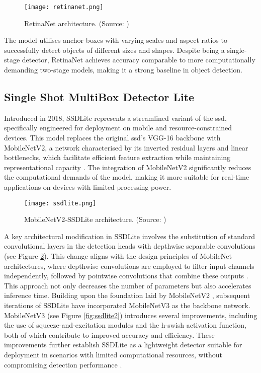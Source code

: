 \begin{figure}[!htbp]
    \centering
    \texttt{[image: retinanet.png]}
    \caption{RetinaNet architecture. (Source: \cite{retinanet})}
    \label{fig:retinanet}
\end{figure}

The model utilises anchor boxes with varying scales and aspect ratios to successfully detect objects of different sizes and shapes. Despite being a single-stage detector, RetinaNet achieves accuracy comparable to more computationally demanding two-stage models, making it a strong baseline in object detection. 


\subsection{Single Shot MultiBox Detector Lite}
\label{subsec:4_ssdlite}

Introduced in 2018, SSDLite \cite{ssdlite} represents a streamlined variant of the \gls{ssd}, specifically engineered for deployment on mobile and resource-constrained devices. This model replaces the original \gls{ssd}'s VGG-16 backbone with MobileNetV2, a network characterised by its inverted residual layers and linear bottlenecks, which facilitate efficient feature extraction while maintaining representational capacity \cite{ssdlite}. The integration of MobileNetV2 significantly reduces the computational demands of the model, making it more suitable for real-time applications on devices with limited processing power.

\begin{figure}[!htbp]
    \centering
    \texttt{[image: ssdlite.png]}
    \caption{MobileNetV2-SSDLite architecture. (Source: \cite{ssdlite_diagram})}
    \label{fig:ssdlite}
\end{figure}

A key architectural modification in SSDLite involves the substitution of standard convolutional layers in the detection heads with depthwise separable convolutions (see Figure \ref{fig:ssdlite}). This change aligns with the design principles of MobileNet architectures, where depthwise convolutions are employed to filter input channels independently, followed by pointwise convolutions that combine these outputs \cite{mobilenet}. This approach not only decreases the number of parameters but also accelerates inference time.
Building upon the foundation laid by MobileNetV2 \cite{ssdlite}, subsequent iterations of SSDLite have incorporated MobileNetV3 \cite{mobilenetv3} as the backbone network. MobileNetV3 (see Figure \ref{fig:ssdlite2}) introduces several improvements, including the use of squeeze-and-excitation modules and the h-swish activation function, both of which contribute to improved accuracy and efficiency. These improvements further establish SSDLite as a lightweight detector suitable for deployment in scenarios with limited computational resources, without compromising detection performance \cite{ssdlite}.

